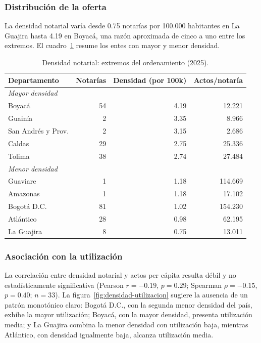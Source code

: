 \documentclass{article}
\begin{document}
\subsubsection*{Distribución de la oferta}

La densidad notarial varía desde 0.75 notarías por 100.000 habitantes
en La Guajira hasta 4.19 en Boyacá, una razón aproximada de cinco a
uno entre los extremos. El cuadro~\ref{tab:densidad-resumen} resume los
entes con mayor y menor densidad.

\begin{table}[H]
\centering
\caption{Densidad notarial: extremos del ordenamiento (2025).}
\label{tab:densidad-resumen}
\small
\begin{tabular}{lrrr}
\toprule
\textbf{Departamento} & \textbf{Notarías} & \textbf{Densidad (por 100k)} & \textbf{Actos/notaría} \\
\midrule
\multicolumn{4}{l}{\textit{Mayor densidad}} \\
Boyacá             & 54 & 4.19 &  12.221 \\
Guainía            &  2 & 3.35 &   8.966 \\
San Andrés y Prov. &  2 & 3.15 &   2.686 \\
Caldas             & 29 & 2.75 &  25.336 \\
Tolima             & 38 & 2.74 &  27.484 \\
\midrule
\multicolumn{4}{l}{\textit{Menor densidad}} \\
Guaviare           &  1 & 1.18 & 114.669 \\
Amazonas           &  1 & 1.18 &  17.102 \\
Bogotá D.C.        & 81 & 1.02 & 154.230 \\
Atlántico          & 28 & 0.98 &  62.195 \\
La Guajira         &  8 & 0.75 &  13.011 \\
\bottomrule
\end{tabular}
\end{table}

\subsubsection*{Asociación con la utilización}

La correlación entre densidad notarial y actos per cápita resulta débil
y no estadísticamente significativa (Pearson $r = -0.19$, $p = 0.29$;
Spearman $\rho = -0.15$, $p = 0.40$; $n = 33$). La
figura~\ref{fig:densidad-utilizacion} sugiere la ausencia de un
patrón monotónico claro: Bogotá D.C., con la segunda menor densidad
del país, exhibe la mayor utilización; Boyacá, con la mayor densidad,
presenta utilización media; y La Guajira combina la menor densidad con
utilización baja, mientras Atlántico, con densidad igualmente baja,
alcanza utilización media.
\end{document}
